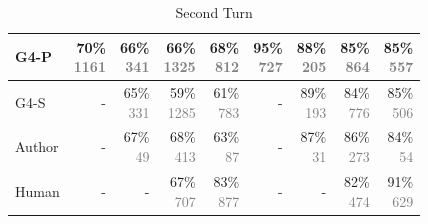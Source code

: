 \begin{table}[h]
\begin{subtable}[t]{\textwidth}
\begin{tabular}[t]{lrrrrrrrr}
G4-P & \shortstack{70\% \\ \textcolor{gray}{ 1161 }} & \shortstack{66\% \\ \textcolor{gray}{ 341 }} & \shortstack{66\% \\ \textcolor{gray}{ 1325 }} & \shortstack{68\% \\ \textcolor{gray}{ 812 }} & \shortstack{95\% \\ \textcolor{gray}{ 727 }} & \shortstack{88\% \\ \textcolor{gray}{ 205 }} & \shortstack{85\% \\ \textcolor{gray}{ 864 }} & \shortstack{85\% \\ \textcolor{gray}{ 557 }}\\
 \midrule
G4-S & - & \shortstack{65\% \\ \textcolor{gray}{ 331 }} & \shortstack{59\% \\ \textcolor{gray}{ 1285 }} & \shortstack{61\% \\ \textcolor{gray}{ 783 }} & - & \shortstack{89\% \\ \textcolor{gray}{ 193 }} & \shortstack{84\% \\ \textcolor{gray}{ 776 }} & \shortstack{85\% \\ \textcolor{gray}{ 506 }}\\
 \midrule
Author & - & \shortstack{67\% \\ \textcolor{gray}{ 49 }} & \shortstack{68\% \\ \textcolor{gray}{ 413 }} & \shortstack{63\% \\ \textcolor{gray}{ 87 }} & - & \shortstack{87\% \\ \textcolor{gray}{ 31 }} & \shortstack{86\% \\ \textcolor{gray}{ 273 }} & \shortstack{84\% \\ \textcolor{gray}{ 54 }}\\
 \midrule
Human & - & - & \shortstack{67\% \\ \textcolor{gray}{ 707 }} & \shortstack{83\% \\ \textcolor{gray}{ 877 }} & - & - & \shortstack{82\% \\ \textcolor{gray}{ 474 }} & \shortstack{91\% \\ \textcolor{gray}{ 629 }}\\
 \midrule
\end{tabular}
\caption{Second Turn}
\label{table:mt_bench_more_second_turn}
\end{subtable}
\label{table:agreement_mt_full}
\end{table}



